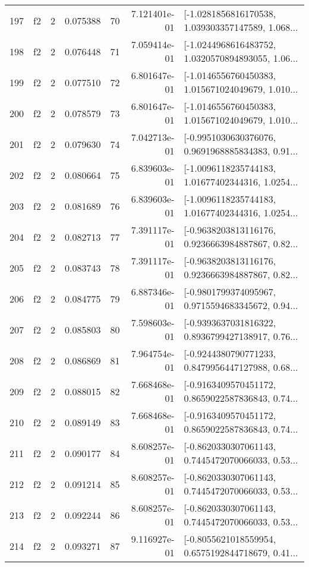 \begin{tabular}{lllrlrl}
197 &  f2 &   2 &  0.075388 &   70 &  7.121401e-01 &  [-1.0281856816170538, 1.039303357147589, 1.068... \\
198 &  f2 &   2 &  0.076448 &   71 &  7.059414e-01 &  [-1.0244968616483752, 1.0320570894893055, 1.06... \\
199 &  f2 &   2 &  0.077510 &   72 &  6.801647e-01 &  [-1.0146556760450383, 1.015671024049679, 1.010... \\
200 &  f2 &   2 &  0.078579 &   73 &  6.801647e-01 &  [-1.0146556760450383, 1.015671024049679, 1.010... \\
201 &  f2 &   2 &  0.079630 &   74 &  7.042713e-01 &  [-0.9951030630376076, 0.9691968885834383, 0.91... \\
202 &  f2 &   2 &  0.080664 &   75 &  6.839603e-01 &  [-1.0096118235744183, 1.01677402344316, 1.0254... \\
203 &  f2 &   2 &  0.081689 &   76 &  6.839603e-01 &  [-1.0096118235744183, 1.01677402344316, 1.0254... \\
204 &  f2 &   2 &  0.082713 &   77 &  7.391117e-01 &  [-0.9638203813116176, 0.9236663984887867, 0.82... \\
205 &  f2 &   2 &  0.083743 &   78 &  7.391117e-01 &  [-0.9638203813116176, 0.9236663984887867, 0.82... \\
206 &  f2 &   2 &  0.084775 &   79 &  6.887346e-01 &  [-0.9801799374095967, 0.9715594683345672, 0.94... \\
207 &  f2 &   2 &  0.085803 &   80 &  7.598603e-01 &  [-0.9393637031816322, 0.8936799427138917, 0.76... \\
208 &  f2 &   2 &  0.086869 &   81 &  7.964754e-01 &  [-0.9244380790771233, 0.8479956447127988, 0.68... \\
209 &  f2 &   2 &  0.088015 &   82 &  7.668468e-01 &  [-0.9163409570451172, 0.8659022587836843, 0.74... \\
210 &  f2 &   2 &  0.089149 &   83 &  7.668468e-01 &  [-0.9163409570451172, 0.8659022587836843, 0.74... \\
211 &  f2 &   2 &  0.090177 &   84 &  8.608257e-01 &  [-0.8620330307061143, 0.7445472070066033, 0.53... \\
212 &  f2 &   2 &  0.091214 &   85 &  8.608257e-01 &  [-0.8620330307061143, 0.7445472070066033, 0.53... \\
213 &  f2 &   2 &  0.092244 &   86 &  8.608257e-01 &  [-0.8620330307061143, 0.7445472070066033, 0.53... \\
214 &  f2 &   2 &  0.093271 &   87 &  9.116927e-01 &  [-0.8055621018559954, 0.6575192844718679, 0.41... \\

\end{tabular}
